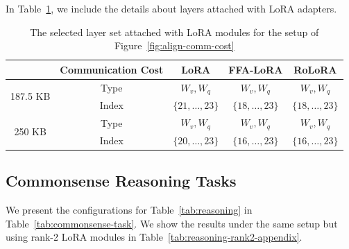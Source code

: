 \documentclass{article}
\theoremstyle{plain}
\theoremstyle{definition}
\theoremstyle{remark}
\begin{document}
 In Table~\ref{tab:layer_type_index-align-comm-cost}, we include the details about layers attached with LoRA adapters.

\begin{table}[h!]
\centering
{\footnotesize
    \begin{tabular}{ccccc}
    \toprule
                            & Communication Cost & LoRA & FFA-LoRA & RoLoRA  \\
                            \midrule
\multirow{2}{*}{187.5 KB} & Type             &     $W_v,W_q$   &  $W_v,W_q$     &   $W_v,W_q$     \\
                    & Index            &   $\{21,\ldots,23\}$    &   $\{18,\ldots,23\}$   &  $\{18,\ldots,23\}$     \\
                    \midrule
                    \multirow{2}{*}{250 KB} & Type             &     $W_v,W_q$   &  $W_v,W_q$     &   $W_v,W_q$     \\
                    & Index            &   $\{20,\ldots,23\}$    &   $\{16,\ldots,23\}$   &  $\{16,\ldots,23\}$       \\ \bottomrule
    \end{tabular}}
    \vspace{4pt}
    \caption{The selected layer set attached with LoRA modules for the setup of Figure~\ref{fig:align-comm-cost}}
    \label{tab:layer_type_index-align-comm-cost}
\end{table}


 \subsection{Commonsense Reasoning Tasks} \label{sec:setup-CRT}
 \vspace{-0.3cm}
We present the configurations for Table~\ref{tab:reasoning} in Table~\ref{tab:commonsense-task}. We show the results under the same setup but using rank-2 LoRA modules in Table~\ref{tab:reasoning-rank2-appendix}.  
\end{document}
